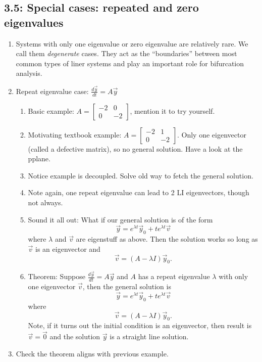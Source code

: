 \documentclass{article}
\begin{document}
\subsection{3.5: Special cases: repeated and zero eigenvalues}
\begin{enumerate}
\item Systems with only one eigenvalue or zero eigenvalue are relatively rare. We call them \emph{degenerate} cases. They act as the ``boundaries'' between most common types of liner systems and play an important role for bifurcation analysis. 

\item Repeat eigenvalue case: $\frac{d \vec{y}}{dt} = A\vec{y}$ 
\begin{enumerate}
\item Basic example: $A = \begin{bmatrix}  -2 & 0 \\ 0 & -2 \end{bmatrix}$, mention it to try yourself.
\item Motivating textbook example: $A = \begin{bmatrix}  -2 & 1 \\ 0 & -2 \end{bmatrix}$. Only one eigenvector (called a defective matrix), so no general solution. Have a look at the pplane. 
\item Notice example is decoupled. Solve old way to fetch the general solution.
\item Note again, one repeat eigenvalue can lead to 2 LI eigenvectors, though not always.
\item Sound it all out: What if our general solution is of the form
\[
\vec{y} = e^{\lambda t} \vec{y}_0 + t e^{\lambda t} \vec{v}
\]
where $\lambda$ and $\vec{v}$ are eigenstuff as above. Then the solution works so long as $\vec{v}$ is an eigenvector and
\[
\vec{v} = (A-\lambda I)\vec{y}_0.
\]
\item Theorem: Suppose $\frac{d\vec{y}}{dt} = A\vec{y}$ and $A$ has a repeat eigenvalue $\lambda$ with only one eigenvector $\vec{v}$, then the general solution is
\[
\vec{y} = e^{\lambda t} \vec{y}_0 + t e^{\lambda t} \vec{v}
\]
where
\[
\vec{v} = (A-\lambda I)\vec{y}_0.
\]
Note, if it turns out  the initial condition is an eigenvector, then result is $\vec{v}=\vec{0}$ and the solution $\vec{y}$ is a straight line solution.
\end{enumerate}

\item Check the theorem aligns with previous example.


\end{enumerate}
\end{document}
